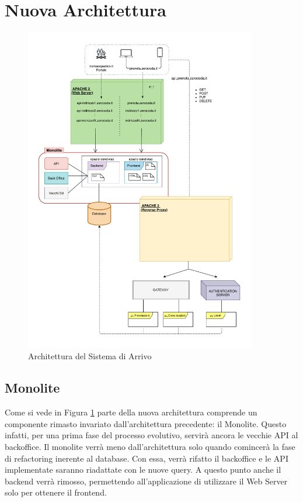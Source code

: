 \section{Nuova Architettura}
\begin{figure}[H]
    \centering
    \includegraphics[width=0.90\textwidth]{images/02_6_new_architecture.pdf}
    \caption{Architettura del Sistema di Arrivo}
    \label{fig:newarchitecture}
\end{figure}

\subsection{Monolite}
Come si vede in Figura \ref{fig:newarchitecture} parte della nuova architettura comprende un componente rimasto invariato dall'architettura precedente: il Monolite. Questo infatti, per una prima fase del processo evolutivo, servirà ancora le vecchie API al backoffice. Il monolite verrà meno dall'architettura solo quando comincerà la fase di refactoring inerente al database. Con essa, verrà rifatto il backoffice e le API implementate saranno riadattate con le nuove query. A questo punto anche il backend verrà rimosso, permettendo all'applicazione di utilizzare il Web Server solo per ottenere il frontend.

